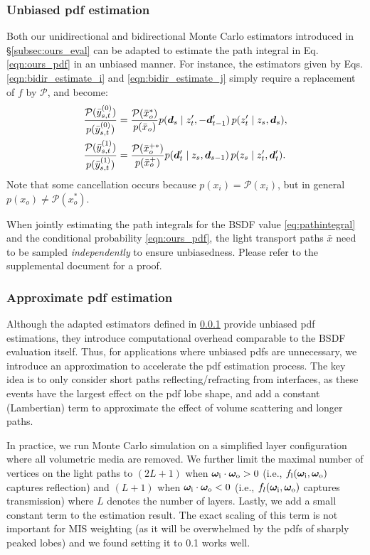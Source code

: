 \subsubsection{Unbiased pdf estimation}
\label{sssec:ours_pdf_unbiased}

Both our unidirectional and bidirectional Monte Carlo estimators introduced in \S\ref{subsec:ours_eval} can be adapted to estimate the path integral in Eq. \eqref{eqn:ours_pdf} in an unbiased manner.
For instance, the estimators given by Eqs. \eqref{eqn:bidir_estimate_i} and \eqref{eqn:bidir_estimate_j} simply require a replacement of $f$ by $\mathcal P$, and become:
\begin{align}
	\label{eqn:bidir_pdf_i}
	\frac{\mathcal{P}(\bar{y}^{(0)}_{s, t})}{p(\bar{y}^{(0)}_{s, t})} &= \frac{\mathcal{P}(\bar{x}_o^*)}{p(\bar{x}_o)}
	 p( \bm{d}_s \;|\; z'_t, -\bm{d}'_{t - 1}) \, p(z'_t \;|\; z_s, \bm{d}_s),\\
	\label{eqn:bidir_pdf_j}
	\frac{\mathcal{P}(\bar{y}^{(1)}_{s, t})}{p(\bar{y}^{(1)}_{s, t})} &= \frac{\mathcal{P}(\bar{x}_o^{+*})}{p(\bar{x}_o^+)}
	 p( \bm{d}'_t \;|\; z_s, \bm{d}_{s - 1}) \, p(z_s \;|\; z'_t, \bm{d}'_t ).
\end{align}
Note that some cancellation occurs because $p(x_i) = \mathcal P(x_i)$, but in general $p(x_o) \neq \mathcal P(x_o^*)$.

When jointly estimating the path integrals for the BSDF value \eqref{eq:pathintegral} and the conditional probability \eqref{eqn:ours_pdf}, the light transport paths $\bar{x}$ need to be sampled \emph{independently} to ensure unbiasedness.
Please refer to the supplemental document for a proof.

\subsubsection{Approximate pdf estimation}
\label{sssec:ours_pdf_approx}
%
Although the adapted estimators defined in \ref{sssec:ours_pdf_unbiased} provide unbiased pdf estimations, they introduce computational overhead comparable to the BSDF evaluation itself.
Thus, for applications where unbiased pdfs are unnecessary, we introduce an approximation to accelerate the pdf estimation process. The key idea is to only consider short paths reflecting/refracting from interfaces, as these events have the largest effect on the pdf lobe shape, and add a constant (Lambertian) term to approximate the effect of volume scattering and longer paths.

In practice, we run Monte Carlo simulation on a simplified layer configuration where all volumetric media are removed.
We further limit the maximal number of vertices on the light paths to $(2L + 1)$ when $\bm\omega_\mathrm{i} \cdot \bm\omega_\mathrm{o} > 0$ (i.e., $f_\mathrm{l}(\bm\omega_\mathrm{i}, \bm\omega_\mathrm{o})$ captures reflection) and $(L + 1)$ when $\bm\omega_\mathrm{i} \cdot \bm\omega_\mathrm{o} < 0$ (i.e., $f_l(\bm\omega_\mathrm{i}, \bm\omega_\mathrm{o})$ captures transmission) where $L$ denotes the number of layers.
Lastly, we add a small constant term to the estimation result. The exact scaling of this term is not important for MIS weighting (as it will be overwhelmed by the pdfs of sharply peaked lobes) and we found setting it to 0.1 works well.

